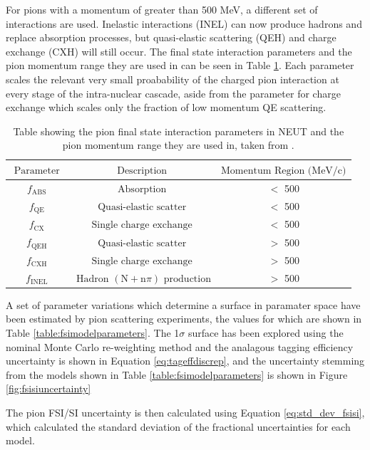 For pions with a momentum of greater than 500 MeV, a different set of interactions are used. Inelastic interactions (INEL) can now produce hadrons and replace absorption processes, but quasi-elastic scattering (QEH) and charge exchange (CXH) will still occur. The final state interaction parameters and the pion momentum range they are used in can be seen in Table \ref{table:fsiparameters}. Each parameter scales the relevant very small proabability of the charged pion interaction at every stage of the intra-nuclear cascade, aside from the parameter for charge exchange which scales only the fraction of low momentum QE scattering. 


\begin{table}
\centering
\begin{tabular}{||ccc||}
\hline
$\text { Parameter }$ & $\text { Description }$ & $\text{Momentum Region (MeV/c)}$\\
\hline
$f_{\text{ABS}}$ & $\text{Absorption}$ & $<$ 500 \\
$f_{\text{QE}}$ & $\text { Quasi-elastic scatter }$ & $<$ 500 \\
$f_{\text{CX}}$ & $\text { Single charge exchange }$ & $<$ 500 \\
$f_{\text{QEH}}$ & $\text { Quasi-elastic scatter }$ & $>$ 500 \\
$f_{\text{CXH}}$ & $\text { Single charge exchange }$ & $>$ 500 \\
$f_{\text{INEL}}$ & $\text { Hadron }(\text{N}+\text{n}\pi)$ $\text {production}$ & $>$ 500 \\
\hline
\end{tabular}
\caption{Table showing the pion final state interaction parameters in NEUT and the pion momentum range they are used in, taken from \cite{tn_32}.}
\label{table:fsiparameters}
\end{table}



A set of parameter variations which determine a surface in paramater space have been estimated by pion scattering experiments, the values for which are shown in Table \ref{table:fsimodelparameters}. The 1$\sigma$ surface has been explored using the nominal Monte Carlo re-weighting method and the analagous tagging efficiency uncertainty is shown in Equation \ref{eq:tageffdiscrep}, and the uncertainty stemming from the models shown in Table \ref{table:fsimodelparameters} is shown in Figure \ref{fig:fsisiuncertainty}


The pion FSI/SI uncertainty is then calculated using Equation \ref{eq:std_dev_fsisi}, which calculated the standard deviation of the fractional uncertainties for each model.


